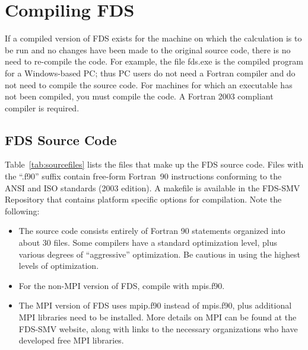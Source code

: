 \documentclass[11pt]{book}
\begin{document}
\chapter{Compiling FDS}
\label{info:compilation}

If a compiled version of FDS exists for the machine on which the calculation is to be run and no changes have been made to the original source code, there is no need to re-compile the code. For example, the file {\ct fds.exe} is the compiled program for a Windows-based PC; thus PC users do not need a Fortran compiler and do not need to compile the source code. For machines for which an executable has not been compiled, you must compile the code. A Fortran 2003 compliant compiler is required.

\section{FDS Source Code}

Table~\ref{tab:sourcefiles} lists the files that make up the FDS source code. Files with the ``.f90'' suffix contain free-form Fortran~90 instructions conforming to the ANSI and ISO standards (2003 edition). A {\ct makefile} is available in the FDS-SMV Repository that contains platform specific options for compilation. Note the following:
\begin{itemize}
\item The source code consists entirely of Fortran 90 statements organized into about 30 files. Some compilers have a standard optimization level, plus various degrees of ``aggressive'' optimization. Be cautious in using the highest levels of optimization.
\item For the non-MPI version of FDS, compile with {\ct mpis.f90}.
\item The MPI version of FDS uses {\ct mpip.f90} instead of {\ct mpis.f90}, plus additional MPI libraries need to be installed. More details on MPI can be found at the FDS-SMV website, along with links to the necessary organizations who have developed free MPI libraries.
\end{itemize}
\end{document}
